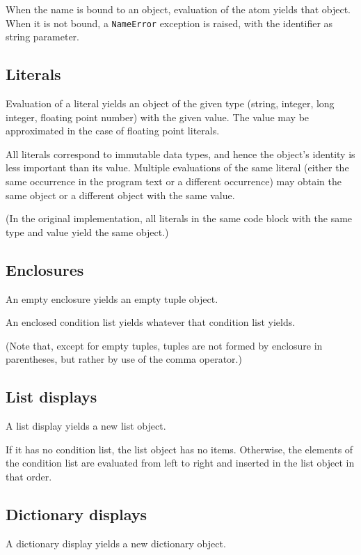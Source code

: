 When the name is bound to an object, evaluation of the atom
yields that object.
When it is not bound, a {\tt NameError} exception
is raised, with the identifier as string parameter.

\subsection{Literals}

Evaluation of a literal yields an object of the given type
(string, integer, long integer, floating point number)
with the given value.
The value may be approximated in the case of floating point literals.

All literals correspond to immutable data types, and hence the object's
identity is less important than its value.
Multiple evaluations of the same literal (either the same occurrence
in the program text or a different occurrence) may
obtain the same object or a different object with the same value.

(In the original implementation, all literals in the same code block
with the same type and value yield the same object.)

\subsection{Enclosures}

An empty enclosure yields an empty tuple object.

An enclosed condition list yields whatever that condition list yields.

(Note that, except for empty tuples, tuples are not formed by
enclosure in parentheses, but rather by use of the comma operator.)

\subsection{List displays}

A list display yields a new list object.

If it has no condition list, the list object has no items.
Otherwise, the elements of the condition list are evaluated
from left to right and inserted in the list object in that order.

\subsection{Dictionary displays}

A dictionary display yields a new dictionary object.


